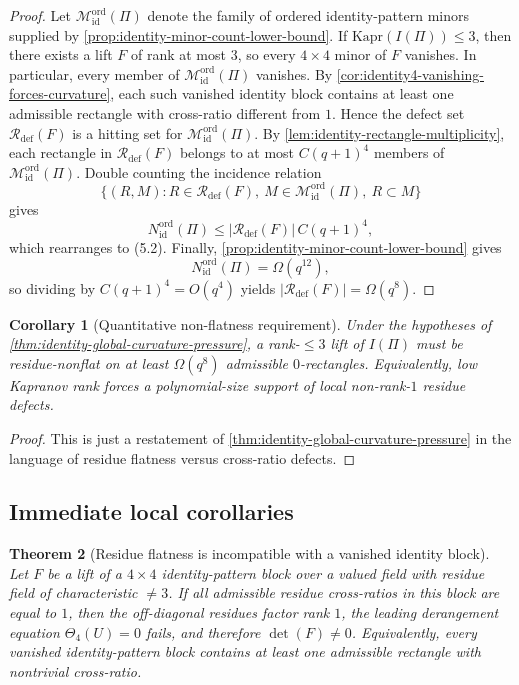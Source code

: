 \documentclass[11pt]{amsart}
\numberwithin{equation}{section}
\theoremstyle{plain}
\newtheorem{theorem}{Theorem}[section]
\newtheorem{corollary}[theorem]{Corollary}
\theoremstyle{definition}
\theoremstyle{remark}
\newcommand{\Kapr}{\mathrm{Kapr}}
\begin{document}
\begin{proof}
Let $\mathcal M_{\mathrm{id}}^{\mathrm{ord}}(\Pi)$ denote the family of ordered identity-pattern minors supplied by \cref{prop:identity-minor-count-lower-bound}.
If $\Kapr(I(\Pi))\le 3$, then there exists a lift $F$ of rank at most $3$, so every $4\times4$ minor of $F$ vanishes.
In particular, every member of $\mathcal M_{\mathrm{id}}^{\mathrm{ord}}(\Pi)$ vanishes.
By \cref{cor:identity4-vanishing-forces-curvature}, each such vanished identity block contains at least one admissible rectangle with cross-ratio different from $1$.
Hence the defect set $\mathcal R_{\mathrm{def}}(F)$ is a hitting set for $\mathcal M_{\mathrm{id}}^{\mathrm{ord}}(\Pi)$.
By \cref{lem:identity-rectangle-multiplicity}, each rectangle in $\mathcal R_{\mathrm{def}}(F)$ belongs to at most $C(q+1)^4$ members of $\mathcal M_{\mathrm{id}}^{\mathrm{ord}}(\Pi)$.
Double counting the incidence relation
\[
\{(R,M):R\in \mathcal R_{\mathrm{def}}(F),\ M\in \mathcal M_{\mathrm{id}}^{\mathrm{ord}}(\Pi),\ R\subset M\}
\]
gives
\[
N_{\mathrm{id}}^{\mathrm{ord}}(\Pi)
\le
|\mathcal R_{\mathrm{def}}(F)|\,C(q+1)^4,
\]
which rearranges to \textup{(5.2)}.
Finally, \cref{prop:identity-minor-count-lower-bound} gives
\[
N_{\mathrm{id}}^{\mathrm{ord}}(\Pi)=\Omega(q^{12}),
\]
so dividing by $C(q+1)^4=O(q^4)$ yields $|\mathcal R_{\mathrm{def}}(F)|=\Omega(q^8)$.
\end{proof}

\begin{corollary}[Quantitative non-flatness requirement]
\label{cor:identity-global-curvature-pressure}
Under the hypotheses of \cref{thm:identity-global-curvature-pressure}, a rank-$\le 3$ lift of $I(\Pi)$ must be residue-nonflat on at least $\Omega(q^8)$ admissible $0$-rectangles.
Equivalently, low Kapranov rank forces a polynomial-size support of local non-rank-$1$ residue defects.
\end{corollary}

\begin{proof}
This is just a restatement of \cref{thm:identity-global-curvature-pressure} in the language of residue flatness versus cross-ratio defects.
\end{proof}


\subsection{Immediate local corollaries}
\begin{theorem}[Residue flatness is incompatible with a vanished identity block]
\label{thm:flat-chart-obstruction}
Let $F$ be a lift of a $4\times4$ identity-pattern block over a valued field with residue field of characteristic $\neq 3$.
If all admissible residue cross-ratios in this block are equal to $1$, then the off-diagonal residues factor rank $1$, the leading derangement equation $\Theta_4(U)=0$ fails, and therefore $\det(F)\neq 0$.
Equivalently, every vanished identity-pattern block contains at least one admissible rectangle with nontrivial cross-ratio.
\end{theorem}
\end{document}
